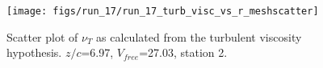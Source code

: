 \begin{figure}[H]
\centering
\texttt{[image: figs/run\_17/run\_17\_turb\_visc\_vs\_r\_meshscatter]}
\caption{Scatter plot of $\nu_T$ as calculated from the turbulent viscosity hypothesis. $z/c$=6.97, $V_{free}$=27.03, station 2.}
\label{fig:run_17_turb_visc_vs_r_meshscatter}
\end{figure}



